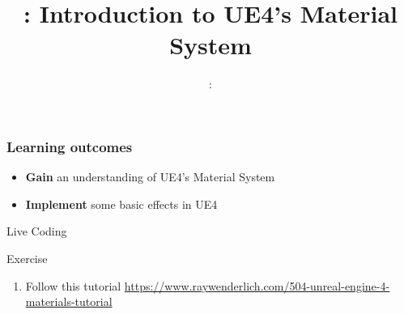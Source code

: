 \usepackage{../../beamerthemeFalmouthGamesAcademy}
\usepackage{multimedia}
\graphicspath{ {../../} }


\usepackage[normalem]{ulem}
\usepackage{wasysym}

\usepackage{pdfpages}

\usetikzlibrary{arrows,automata}




\title{\sessionnumber: Introduction to UE4's Material System}
\subtitle{\modulecode: \moduletitle}

\frame{\titlepage} 

\begin{frame}
	\frametitle{Learning outcomes}
	\begin{itemize}
		\item \textbf{Gain} an understanding of UE4's Material System
		\item \textbf{Implement} some basic effects in UE4
	\end{itemize}
\end{frame}

\begin{frame}
	\begin{center}
		Live Coding
	\end{center}
\end{frame}


\begin{frame}{Exercise}
\begin{enumerate}
	\item Follow this tutorial \url{https://www.raywenderlich.com/504-unreal-engine-4-materials-tutorial} 
\end{enumerate}
\end{frame}

